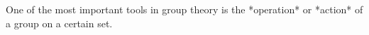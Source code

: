 
One of the most  important tools in  group  theory is the *operation*  or
*action* of a group on a certain set.


